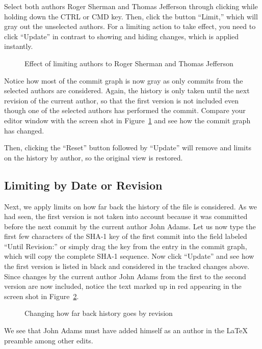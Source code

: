 Select both authors Roger Sherman and Thomas Jefferson through clicking while holding down the CTRL or CMD key.  Then, click the button ``Limit,'' which will gray out the unselected authors.  For a limiting action to take effect, you need to click ``Update'' in contrast to showing and hiding changes, which is applied instantly.
\begin{figure}[t]
\centering
{}
\caption{Effect of limiting authors to Roger Sherman and Thomas Jefferson} \label{fig:limit-authors}
\end{figure}
Notice how most of the commit graph is now gray as only commits from the selected authors are considered.  Again, the history is only taken until the next revision of the current author, so that the first version is not included even though one of the selected authors has performed the commit.  Compare your editor window with the screen shot in Figure~\ref{fig:limit-authors} and see how the commit graph has changed.

Then, clicking the ``Reset'' button followed by ``Update'' will remove and limits on the history by author, so the original view is restored.

\subsection{Limiting by Date or Revision}

Next, we apply limits on how far back the history of the file is considered.  As we had seen, the first version is not taken into account because it was committed before the next commit by the current author John Adams.  Let us now type the first few characters  of the SHA-1 key of the first commit into the field labeled ``Until Revision:'' or simply drag the key from the entry in the commit graph, which will copy the complete SHA-1 sequence.  Now click ``Update'' and see how the first version is listed in black and considered in the tracked changes above.  Since changes by the current author John Adams from the first to the second version are now included, notice the text marked up in red appearing in the screen shot in Figure~\ref{fig:limit-rev}.
\begin{figure}[t]
\centering
{}
\caption{Changing how far back history goes by revision} \label{fig:limit-rev}
\end{figure}
We see that John Adams must have added himself as an author in the LaTeX preamble among other edits.

